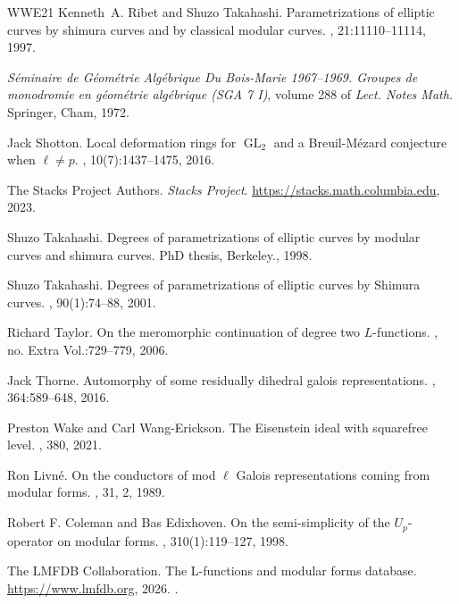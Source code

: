 \documentclass[a4paper, notitlepage, 10pt]{amsart}
\theoremstyle{plain} %
\theoremstyle{definition} %
\theoremstyle{remark} %
\numberwithin{equation}{section}
\newcommand{\GL}{\operatorname{GL}} %
\begin{document}
\begin{thebibliography}{WWE21}
Kenneth~A. Ribet and Shuzo Takahashi.
\newblock Parametrizations of elliptic curves by shimura curves and by classical modular curves.
, 21:11110--11114, 1997.

{\em S{\'e}minaire de {G{\'e}om{\'e}trie} {Alg{\'e}brique} {Du} {Bois}-{Marie} 1967--1969. {Groupes} de monodromie en g{\'e}om{\'e}trie alg{\'e}brique ({SGA} 7 {I})}, volume 288 of {\em Lect. Notes Math.}
\newblock Springer, Cham, 1972.

Jack Shotton.
\newblock Local deformation rings for ${\GL_2}$ and a {B}reuil-{M}ézard conjecture when $\ell \neq p$.
, 10(7):1437--1475, 2016.

The {Stacks Project Authors}.
\newblock \textit{Stacks Project}.
\newblock \url{https://stacks.math.columbia.edu}, 2023.

Shuzo Takahashi.
\newblock Degrees of parametrizations of elliptic curves by modular curves and shimura curves.
\newblock PhD thesis, Berkeley., 1998.

Shuzo Takahashi.
\newblock Degrees of parametrizations of elliptic curves by {Shimura} curves.
, 90(1):74--88, 2001.

Richard Taylor.
\newblock On the meromorphic continuation of degree two {$L$}-functions.
, no. Extra Vol.:729--779, 2006.

Jack Thorne.
\newblock Automorphy of some residually dihedral galois representations.
, 364:589--648, 2016.

Preston Wake and Carl Wang-Erickson.
\newblock The {Eisenstein} ideal with squarefree level.
, 380, 2021.

	Ron Livn{\'e}.
\newblock On the conductors of mod {{\(\ell\)}} {Galois} representations coming from modular forms.
, 31, 2, 1989.

    Robert F. Coleman and Bas Edixhoven.
\newblock On the semi-simplicity of the {$U_p$}-operator on modular forms.
, 310(1):119--127, 1998.

    The {LMFDB Collaboration}.
\newblock The {L}-functions and modular forms database.
\newblock \url{https://www.lmfdb.org}, 2026.
.


\end{thebibliography}
\end{document}
